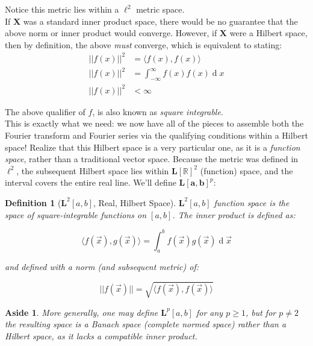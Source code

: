 \documentclass[12pt,a4paper]{report}
\DeclareMathOperator{\deriv}{d}
\theoremstyle{thms}
\newtheorem{aside}{Aside}[section]
\theoremstyle{defns}
\newtheorem{definition}{Definition}[section]
\begin{document}
Notice this metric lies within a $\ell^2$ metric space.\\
If $\mathbf{X}$ was a standard inner product space, there would be no guarantee that the above norm or inner product would converge. However, if $\mathbf{X}$ were a Hilbert space, then by definition, the above \textit{must} converge, which is equivalent to stating:
\begin{align}
    ||f(x)||^2 & = \langle f(x), f(x) \rangle                \\
    ||f(x)||^2 & = \int_{-\infty}^{\infty}f(x)f(x) \deriv{x} \\
    ||f(x)||^2 & < \infty
\end{align}

The above qualifier of $f$, is also known as \textit{square integrable}.\\
This is exactly what we need: we now have all of the pieces to assemble both the Fourier transform and Fourier series via the qualifying conditions within a Hilbert space! Realize that this Hilbert space is a very particular one, as it is a \textit{function space}, rather than a traditional vector space. Because the metric was defined in $\ell^2$, the subsequent Hilbert space lies within $\mathbf{L[\mathbb{R}]}^2$ (function) space, and the interval covers the entire real line. We'll define $\mathbf{L[a, b]}^p$:

\begin{definition}[$\mathbf{L}^2{[a, b]}$, Real, Hilbert Space]
    $\mathbf{L}^2[a, b]$ function space is the space of square-integrable functions on $[a, b]$. The inner product is defined as:

    \begin{equation}
        \langle f(\vec{x}), g(\vec{x}) \rangle = \int_{a}^{b}f(\vec{x})g(\vec{x}) \deriv{\vec{x}}
    \end{equation}

    and defined with a norm (and subsequent metric) of:

    \begin{equation}
        ||f(\vec{x})|| = \sqrt{\langle f(\vec{x}), f(\vec{x}) \rangle}
    \end{equation}

\end{definition}

\begin{aside}
    More generally, one may define $\mathbf{L}^p[a, b]$ for any $p \geq 1$, but for $p \neq 2$ the resulting space is a Banach space (complete normed space) rather than a Hilbert space, as it lacks a compatible inner product.
\end{aside}
\end{document}
